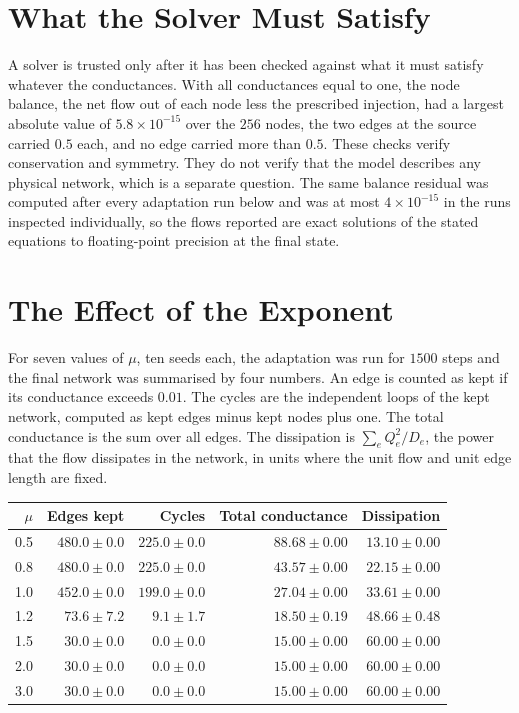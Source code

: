 \section{What the Solver Must Satisfy}

A solver is trusted only after it has been checked against what it must satisfy whatever the conductances. With all conductances equal to one, the node balance, the net flow out of each node less the prescribed injection, had a largest absolute value of $5.8\times10^{-15}$ over the $256$ nodes, the two edges at the source carried $0.5$ each, and no edge carried more than $0.5$. These checks verify conservation and symmetry. They do not verify that the model describes any physical network, which is a separate question. The same balance residual was computed after every adaptation run below and was at most $4\times10^{-15}$ in the runs inspected individually, so the flows reported are exact solutions of the stated equations to floating-point precision at the final state.

\section{The Effect of the Exponent}

For seven values of $\mu$, ten seeds each, the adaptation was run for $1500$ steps and the final network was summarised by four numbers. An edge is counted as kept if its conductance exceeds $0.01$. The cycles are the independent loops of the kept network, computed as kept edges minus kept nodes plus one. The total conductance is the sum over all edges. The dissipation is $\sum_e Q_e^2/D_e$, the power that the flow dissipates in the network, in units where the unit flow and unit edge length are fixed.

\begin{center}
\begin{tabular}{rrrrr}
\toprule
$\mu$ & Edges kept & Cycles & Total conductance & Dissipation\\
\midrule
0.5 & $480.0\pm0.0$ & $225.0\pm0.0$ & $88.68\pm0.00$ & $13.10\pm0.00$\\
0.8 & $480.0\pm0.0$ & $225.0\pm0.0$ & $43.57\pm0.00$ & $22.15\pm0.00$\\
1.0 & $452.0\pm0.0$ & $199.0\pm0.0$ & $27.04\pm0.00$ & $33.61\pm0.00$\\
1.2 & $73.6\pm7.2$ & $9.1\pm1.7$ & $18.50\pm0.19$ & $48.66\pm0.48$\\
1.5 & $30.0\pm0.0$ & $0.0\pm0.0$ & $15.00\pm0.00$ & $60.00\pm0.00$\\
2.0 & $30.0\pm0.0$ & $0.0\pm0.0$ & $15.00\pm0.00$ & $60.00\pm0.00$\\
3.0 & $30.0\pm0.0$ & $0.0\pm0.0$ & $15.00\pm0.00$ & $60.00\pm0.00$\\
\bottomrule
\end{tabular}
\end{center}

